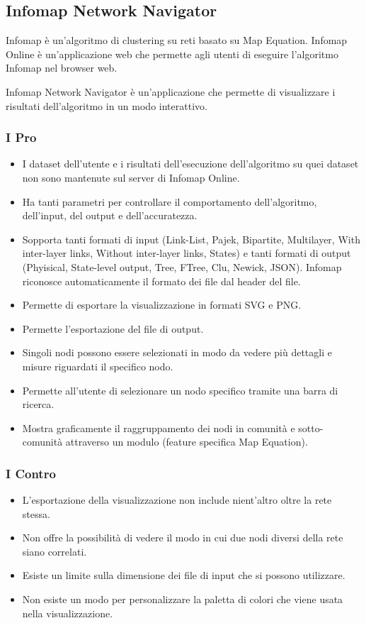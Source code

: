 \documentclass[a4paper,12pt]{report}
\begin{document}
		\subsection{Infomap Network Navigator}
		Infomap è un'algoritmo di clustering su reti basato su Map Equation. Infomap Online è un'applicazione web che permette agli utenti di eseguire
		l'algoritmo Infomap nel browser web. \cite{mapequationsite} 
		
		Infomap Network Navigator è un'applicazione che permette di visualizzare i risultati
		dell'algoritmo in un modo interattivo. \cite{mapequationnavigatorsite} 
		
			\subsubsection*{I Pro}
				\begin{itemize}
					\item I dataset dell'utente e i risultati dell'esecuzione dell'algoritmo su quei dataset non sono mantenute sul server di Infomap Online.
					\item Ha tanti parametri per controllare il comportamento dell'algoritmo, dell'input, del output e dell'accuratezza.
					\item Sopporta tanti formati di input (Link-List, Pajek, Bipartite, Multilayer, With inter-layer links, Without inter-layer links, States) e tanti formati di output (Phyisical, State-level output, Tree, FTree, Clu, Newick, JSON). Infomap riconosce automaticamente il formato dei file dal header del file.
					\item Permette di esportare la visualizzazione in formati SVG e PNG.
					\item Permette l'esportazione del file di output.
					\item Singoli nodi possono essere selezionati in modo da vedere più dettagli e misure riguardati il specifico nodo.
					\item Permette all'utente di selezionare un nodo specifico tramite una barra di ricerca.
					\item Mostra graficamente il raggruppamento dei nodi in comunità e sotto-comunità attraverso un modulo (feature specifica Map Equation).
				\end{itemize}			

			\subsubsection*{I Contro}
				\begin{itemize}
					\item L'esportazione della visualizzazione non include nient'altro oltre la rete stessa.
					\item Non offre la possibilità di vedere il modo in cui due nodi diversi della rete siano correlati.
					\item Esiste un limite sulla dimensione dei file di input che si possono utilizzare.
					\item Non esiste un modo per personalizzare la paletta di colori che viene usata nella visualizzazione.
				\end{itemize}
\end{document}

